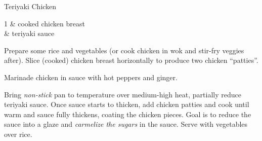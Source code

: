 
\begin{recipe}{Teriyaki Chicken}
  \maketitle

  \begin{ingredients2}
    1 & cooked chicken breast\\
    \quarter \cup & teriyaki sauce
  \end{ingredients2}

  Prepare some rice and vegetables (or cook chicken in wok and stir-fry
  veggies after). Slice (cooked) chicken breast horizontally to produce two
  chicken ``patties''.

  Marinade chicken in sauce with hot peppers and ginger.

  Bring \textsl{non-stick} pan to temperature over medium-high heat,
  partially reduce teriyaki sauce. Once sauce starts to thicken, add
  chicken patties and cook until warm and sauce fully thickens, coating the
  chicken pieces. Goal is to reduce the sauce into a glaze and
  \textsl{carmelize the sugars} in the sauce. Serve with vegetables over
  rice.
\end{recipe}

